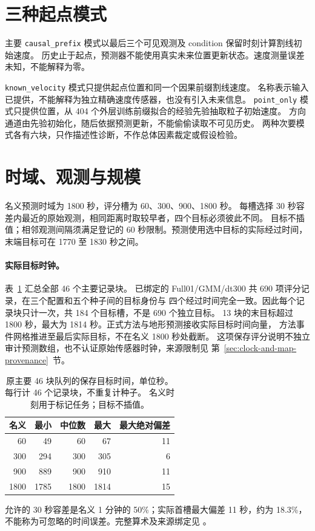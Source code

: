 \section{三种起点模式}
主要 \texttt{causal\_prefix} 模式以最后三个可见观测及 condition 保留时刻计算割线初始速度。
历史止于起点，预测器不能使用真实未来位置更新状态。速度测量误差未知，不能解释为零。

\texttt{known\_velocity} 模式只提供起点位置和同一个因果前缀割线速度。
名称表示输入已提供，不能解释为独立精确速度传感器，也没有引入未来信息。
\texttt{point\_only} 模式只提供位置，从 404 个外层训练前缀拟合的经验先验抽取粒子初始速度。
方向通道由先验初始化，随后依据预测更新，不能偷偷读取不可见历史。
两种次要模式各有六块，只作描述性诊断，不作总体因素裁定或假设检验。


\section{时域、观测与规模}
名义预测时域为 1800 秒，评分槽为 60、300、900、1800 秒。
每槽选择 30 秒容差内最近的原始观测，相同距离时取较早者，四个目标必须彼此不同。
目标不插值；相邻观测间隔须满足登记的 60 秒限制。预测使用选中目标的实际经过时间，
末端目标可在 1770 至 1830 秒之间。

\paragraph{实际目标时钟。}\label{sec:target-times}\hypertarget{sec:target-times}{}
表~\ref{tab:actual-target-times} 汇总全部 46 个主要记录块。
已绑定的 Full01/GMM/dt300 共 690 项评分记录，在三个配置和五个种子间的目标身份与
四个经过时间完全一致。因此每个记录块只计一次，共 184 个目标槽，不是 690 个独立目标。
13 块的末目标超过 1800 秒，最大为 1814 秒。正式方法与地形预测接收实际目标时间向量，
方法事件网格推进至最后实际目标，不在名义 1800 秒处截断。
这项保存评分说明不独立审计预测数组，也不认证原始传感器时钟，来源限制见
第~\ref{sec:clock-and-map-provenance}~节。

\begin{table}[htbp]
\centering\small
\caption{原主要 46 块队列的保存目标时间，单位秒。每行计 46 个记录块，不重复计种子。
名义时刻用于标记任务；目标不插值。}
\label{tab:actual-target-times}\hypertarget{tab:actual-target-times}{}
\begin{tabular}{@{}rrrrr@{}}
\toprule
名义 & 最小 & 中位数 & 最大 & 最大绝对偏差\\
\midrule
60 & 49 & 60 & 67 & 11\\
300 & 294 & 300 & 305 & 6\\
900 & 889 & 900 & 910 & 11\\
1800 & 1785 & 1800 & 1814 & 15\\
\bottomrule
\end{tabular}
\end{table}
允许的 30 秒容差是名义 1 分钟的 50\%；实际首槽最大偏差 11 秒，约为 18.3\%，
不能称为可忽略的时间误差。完整算术及来源绑定见
。

